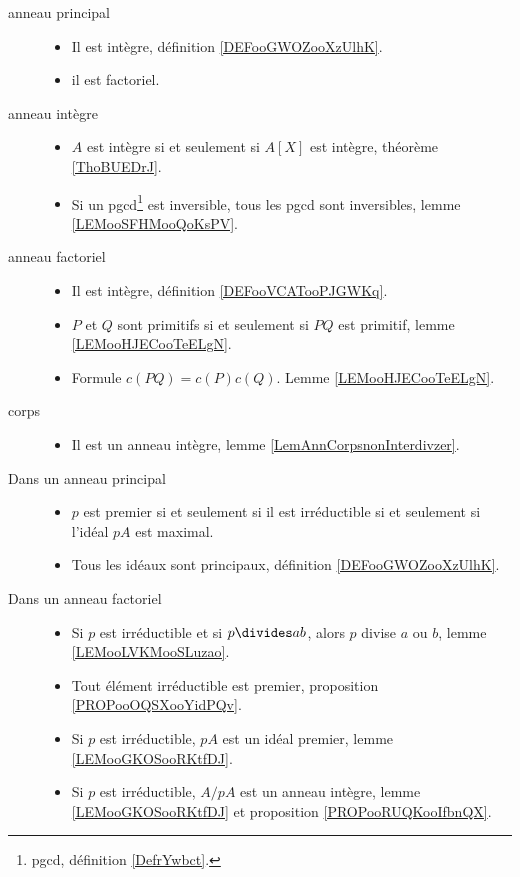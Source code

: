 \begin{description}
	\item[anneau principal]
		\begin{itemize}
			\item
			      Il est intègre, définition \ref{DEFooGWOZooXzUlhK}.
			\item
			      il est factoriel\cite{BIBooENJGooWhQisg}.
		\end{itemize}
	\item[anneau intègre]
		\begin{itemize}
			\item
			      \( A\) est intègre si et seulement si \( A[X]\) est intègre, théorème \ref{ThoBUEDrJ}.
			\item
			      Si un pgcd\footnote{pgcd, définition \ref{DefrYwbct}.} est inversible, tous les pgcd sont inversibles, lemme \ref{LEMooSFHMooQoKsPV}.
		\end{itemize}
	\item[anneau factoriel]
		\begin{itemize}
			\item
			      Il est intègre, définition \ref{DEFooVCATooPJGWKq}.
			\item
			      \( P\) et \( Q\) sont primitifs si et seulement si \( PQ\) est primitif, lemme \ref{LEMooHJECooTeELgN}.
			\item
			      Formule \( c(PQ)=c(P)c(Q)\). Lemme \ref{LEMooHJECooTeELgN}.
		\end{itemize}
	\item[corps]
		\begin{itemize}
			\item
			      Il est un anneau intègre, lemme \ref{LemAnnCorpsnonInterdivzer}.
		\end{itemize}
\end{description}

\begin{description}
	\item[Dans un anneau principal]
		\begin{itemize}
			\item
			      \( p\) est premier si et seulement si il est irréductible si et seulement si l'idéal \( pA\) est maximal.
			\item
			      Tous les idéaux sont principaux, définition \ref{DEFooGWOZooXzUlhK}.
		\end{itemize}
	\item[Dans un anneau factoriel]
		\begin{itemize}
			\item
			      Si \( p\) est irréductible et si \( p\divides ab\), alors \( p\) divise \( a\) ou \( b\), lemme \ref{LEMooLVKMooSLuzao}.
			\item
			      Tout élément irréductible est premier, proposition \ref{PROPooOQSXooYidPQv}.
			\item
			      Si \( p\) est irréductible, \( pA\) est un idéal premier, lemme \ref{LEMooGKOSooRKtfDJ}.
			\item
			      Si \( p\) est irréductible, \( A/pA\) est un anneau intègre, lemme \ref{LEMooGKOSooRKtfDJ} et proposition \ref{PROPooRUQKooIfbnQX}.
		\end{itemize}
\end{description}


